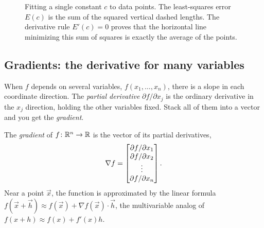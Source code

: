 \begin{figure}[htbp]
\centering
{}
\caption{Fitting a single constant $c$ to data points. The least-squares error $E(c)$ is the sum of the squared vertical dashed lengths. The derivative rule $E'(c)=0$ proves that the horizontal line minimizing this sum of squares is exactly the average of the points.}
\label{ch39:fig-average-fit}
\end{figure}

\subsection{Gradients: the derivative for many variables}
\label{ch39:gradient}

When $f$ depends on several variables, $f(x_1, \dots, x_n)$, there is a slope in each coordinate
direction. The \emph{partial derivative} $\partial f/\partial x_j$ is the ordinary derivative in
the $x_j$ direction, holding the other variables fixed. Stack all of them into a vector and you get
the \emph{gradient}.

\begin{formalbox}
The \emph{gradient} of $f\colon \mathbb{R}^n \to \mathbb{R}$ is the vector of its partial derivatives,
\[
\nabla f = \begin{bmatrix}\partial f/\partial x_1 \\ \partial f/\partial x_2 \\ \vdots \\ \partial f/\partial x_n\end{bmatrix}.
\]
Near a point $\vec{x}$, the function is approximated by the linear formula $f(\vec{x} + \vec{h})
\approx f(\vec{x}) + \nabla f(\vec{x})\cdot \vec{h}$, the multivariable analog of $f(x+h)\approx f(x) +
f'(x)h$.
\end{formalbox}

